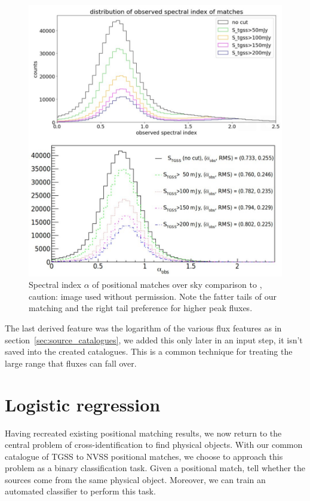\documentclass[12pt,a4paper]{article}
\begin{document}
\begin{figure}[H]
    \centering
    \includegraphics[width=\textwidth]{pics/hist_alpha_comparison-cropped.pdf}
    \caption{Spectral index $\alpha$ of positional matches over sky comparison to \citet{posmatchpaper}, caution: image used without permission. Note the fatter tails of our matching and the right tail preference for higher peak fluxes.}
    \label{fig:hist_alpha_comparison}
\end{figure}

The last derived feature was the logarithm of the various flux features as in section~\ref{sec:source_catalogues}, we added this only later in an input step, it isn't saved into the created catalogues. This is a common technique for treating the large range that fluxes can fall over.

\newpage
\section{Logistic regression}
Having recreated existing positional matching results, we now return to the central problem of cross-identification to find physical objects. With our common catalogue of TGSS to NVSS positional matches, we choose to approach this problem as a binary classification task. Given a positional match, tell whether the sources come from the same physical object. Moreover, we can train an automated classifier to perform this task.\\
\end{document}
